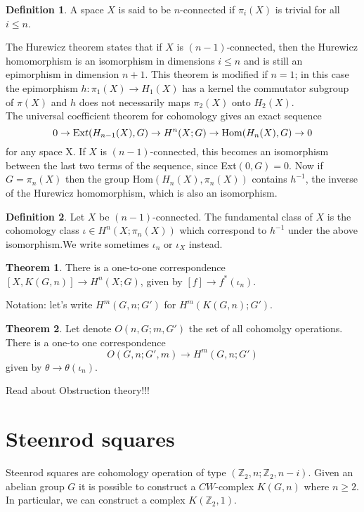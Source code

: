 \documentclass[A4,12pt,oneside]{book}
\theoremstyle{definition}
\newtheorem{teo}{Theorem}
\newtheorem{defi}{Definition}
\begin{document}
\begin{defi}
A space $X$ is said to be $n$-connected if $\pi_i(X)$ is trivial for all $i\leq n$. 
\end{defi} 
The Hurewicz theorem states that if $X$ is $(n-1)$-connected, then the Hurewicz homomorphism is an isomorphism in dimensions $ i \leq n$ and is still an epimorphism in dimension $n+1$. This theorem is modified if
$n=1$; in this case the epimorphism $h:\pi_1(X)\rightarrow H_1(X)$ has a kernel the commutator subgroup of $\pi(X)$ and $h$ does not necessarily maps $\pi_2(X)$ onto $H_2(X)$.\\
The universal coefficient theorem for cohomology gives an exact sequence
\begin{equation*}
0\rightarrow {\rm{Ex}}t(H_{n-1}(X),G)\rightarrow H^n(X;G)\rightarrow {\rm{Hom}}(H_n(X),G)\rightarrow 0
\end{equation*}
for any space X. If $X$ is $(n-1)$-connected, this becomes an isomorphism between the last two terms of the sequence, since Ext$(0,G)=0$. Now if $G=\pi_n(X)$ then the group Hom$(H_n(X),\pi_n(X))$ contains $h^{-1}$, the inverse of the Hurewicz homomorphism, which is also an isomorphism.
\begin{defi}
Let $X$ be $(n-1)$-connected. The fundamental class of $X$ is the cohomology class $\iota\in H^n(X;\pi_n(X))$ which correspond to $h^{-1}$ under the above isomorphism.We write sometimes $\iota_n$ or $\iota_X$ instead. 
\end{defi} 
\begin{teo}
There is a one-to-one correspondence $[X,K(G,n)]\rightarrow H^n(X;G)$, given by $[f]\rightarrow f^*(\iota_n)$.
\end {teo}
Notation: let's write $H^m(G,n;G')$ for $H^m(K(G,n);G')$. 

\begin{teo}
Let denote $O(n,G; m,G')$ the set of all cohomolgy operations. There is a one-to one correspondence 
\begin{equation*}
O(G,n;G',m)\rightarrow H^m(G,n;G')
\end{equation*}
given by $\theta\rightarrow\theta(\iota_n)$.
\end{teo}

Read about Obstruction theory!!!


\section{Steenrod squares}

Steenrod squares are cohomology operation of type $(\mathbb {Z}_2,n;\mathbb{Z}_2,n-i)$. Given an abelian group $G$ it is possible to construct a $CW$-complex $K(G,n)$ where $n\geq 2$. In particular, we can construct a complex $K(\mathbb {Z}_2,1)$.
\end{document}
